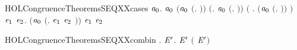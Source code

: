 \begin{SaveVerbatim}{HOLCongruenceTheoremsSEQXXcases}
\HOLTokenTurnstile{} \HOLSymConst{\HOLTokenForall{}}\ensuremath{\HOLBoundVar{a}\sb{\mathrm{0}}}.
        \ensuremath{\HOLBoundVar{a}\sb{\mathrm{0}}} \HOLSymConst{\HOLTokenEquiv{}}
       \ensuremath{(}\ensuremath{\HOLBoundVar{a}\sb{\mathrm{0}}} \HOLSymConst{\ensuremath{=}} \ensuremath{(}\HOLTokenLambda{}. \ensuremath{)}\ensuremath{)} \HOLSymConst{\HOLTokenDisj{}} \ensuremath{(}\HOLSymConst{\HOLTokenExists{}}. \ensuremath{\HOLBoundVar{a}\sb{\mathrm{0}}} \HOLSymConst{\ensuremath{=}} \ensuremath{(}\HOLTokenLambda{}. \ensuremath{)}\ensuremath{)} \HOLSymConst{\HOLTokenDisj{}}
       \ensuremath{(}\HOLSymConst{\HOLTokenExists{}} . \ensuremath{(}\ensuremath{\HOLBoundVar{a}\sb{\mathrm{0}}} \HOLSymConst{\ensuremath{=}} \ensuremath{(}\HOLTokenLambda{}. \HOLSymConst{\ensuremath{\ldotp}} \ensuremath{)}\ensuremath{)} \HOLSymConst{\HOLTokenConj{}}  \ensuremath{)} \HOLSymConst{\HOLTokenDisj{}}
       \HOLSymConst{\HOLTokenExists{}}\ensuremath{\HOLBoundVar{e}\sb{\mathrm{1}}} \ensuremath{\HOLBoundVar{e}\sb{\mathrm{2}}}. \ensuremath{(}\ensuremath{\HOLBoundVar{a}\sb{\mathrm{0}}} \HOLSymConst{\ensuremath{=}} \ensuremath{(}\HOLTokenLambda{}. \ensuremath{\HOLBoundVar{e}\sb{\mathrm{1}}}  \HOLSymConst{\ensuremath{+}} \ensuremath{\HOLBoundVar{e}\sb{\mathrm{2}}} \ensuremath{)}\ensuremath{)} \HOLSymConst{\HOLTokenConj{}}  \ensuremath{\HOLBoundVar{e}\sb{\mathrm{1}}} \HOLSymConst{\HOLTokenConj{}}  \ensuremath{\HOLBoundVar{e}\sb{\mathrm{2}}}
\end{SaveVerbatim}
\newcommand{\HOLCongruenceTheoremsSEQXXcases}{\UseVerbatim{HOLCongruenceTheoremsSEQXXcases}}
\begin{SaveVerbatim}{HOLCongruenceTheoremsSEQXXcombin}
\HOLTokenTurnstile{} \HOLSymConst{\HOLTokenForall{}}.   \HOLSymConst{\HOLTokenImp{}} \HOLSymConst{\HOLTokenForall{}}\ensuremath{\HOLBoundVar{E}\sp{\prime}}.  \ensuremath{\HOLBoundVar{E}\sp{\prime}} \HOLSymConst{\HOLTokenImp{}}  \ensuremath{(} \HOLConst{\HOLTokenCompose} \ensuremath{\HOLBoundVar{E}\sp{\prime}}\ensuremath{)}
\end{SaveVerbatim}
\newcommand{\HOLCongruenceTheoremsSEQXXcombin}{\UseVerbatim{HOLCongruenceTheoremsSEQXXcombin}}
